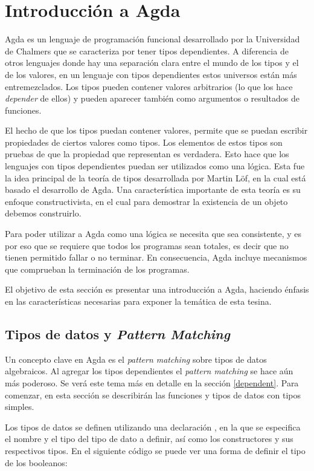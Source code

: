 \chapter{Introducci\'on a Agda} \label{chapter:agda}

Agda es un lenguaje de programación funcional desarrollado por la Universidad de Chalmers que se caracteriza por tener tipos dependientes. A diferencia de otros lenguajes donde hay una separación clara entre el mundo de los tipos y el de los valores, en un lenguaje con tipos dependientes estos universos están más entremezclados. Los tipos pueden contener valores arbitrarios (lo que los hace \textit{depender} de ellos) y pueden aparecer también como argumentos o resultados de funciones.

El hecho de que los tipos puedan contener valores, permite que se puedan escribir propiedades de ciertos valores como tipos. Los elementos de estos tipos son pruebas de que la propiedad que representan es verdadera. Esto hace que los lenguajes con tipos dependientes puedan ser utilizados como una lógica. Esta fue la idea principal de la teoría de tipos desarrollada por Martin Löf, en la cual está basado el desarrollo de Agda. Una característica importante de esta teoría es su enfoque constructivista, en el cual para demostrar la existencia de un objeto debemos construirlo.

Para poder utilizar a Agda como una lógica se necesita que sea consistente, y es por eso que se requiere que todos los programas sean totales, es decir que no tienen permitido fallar o no terminar. En consecuencia, Agda incluye mecanismos que comprueban la terminación de los programas.

El objetivo de esta sección es presentar una introducción a Agda, haciendo énfasis en las características necesarias para exponer la temática de esta tesina. 

\section{Tipos de datos y \textit{Pattern Matching}}

Un concepto clave en Agda es el \textit{pattern matching} sobre tipos de datos algebraicos. Al agregar los tipos dependientes el \textit{pattern matching} se hace aún más poderoso. Se verá este tema más en detalle en la sección \ref{dependent}. Para comenzar, en esta sección se describirán las funciones y tipos de datos con tipos simples. 

Los tipos de datos se definen utilizando una declaración , en la que se especifica el nombre y el tipo del tipo de dato a definir, así como los constructores y sus respectivos tipos. En el siguiente código se puede ver una forma de definir el tipo de los booleanos:


